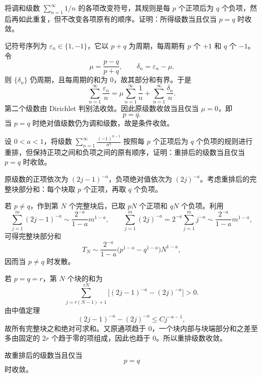 \begin{xexercise}[2]
将调和级数 $\sum_{n=1}^{\infty}1/n$ 的各项改变符号，其规则是每 $p$ 个正项后为 $q$ 个负项，然后再如此重复，但不改变各项原有的顺序。证明：所得级数当且仅当 $p=q$ 时收敛。
\end{xexercise}
\begin{xsolution}
记符号序列为 $\varepsilon_n\in\{1,-1\}$，它以 $p+q$ 为周期，每周期有 $p$ 个 $+1$ 和 $q$ 个 $-1$。令
\[
 \mu=\frac{p-q}{p+q},\qquad \delta_n=\varepsilon_n-\mu.
\]
则 $\{\delta_n\}$ 仍周期，且每周期的和为 $0$，故其部分和有界。于是
\[
 \sum_{n=1}^{\infty}\frac{\varepsilon_n}{n}
 =\mu\sum_{n=1}^{\infty}\frac1n
 +\sum_{n=1}^{\infty}\frac{\delta_n}{n}.
\]
第二个级数由 Dirichlet 判别法收敛。因此原级数收敛当且仅当 $\mu=0$，即
\[
 \boxed{p=q}.
\]
当 $p=q$ 时绝对值级数仍为调和级数，故是条件收敛。
\end{xsolution}


\begin{xexercise}[3]
设 $0<a<1$，将级数 $\sum_{n=1}^{\infty}\frac{(-1)^{n-1}}{n^a}$ 按照每 $p$ 个正项后为 $q$ 个负项的规则进行重排，但保持正项之间和负项之间的原有顺序，证明：重排后的级数当且仅当 $p=q$ 时收敛。
\end{xexercise}
\begin{xsolution}
原级数的正项依次为 $(2j-1)^{-a}$，负项绝对值依次为 $(2j)^{-a}$。考虑重排后的完整块部分和：每个块取 $p$ 个正项，再取 $q$ 个负项。

若 $p\neq q$，作到第 $N$ 个完整块后，已取 $pN$ 个正项和 $qN$ 个负项。利用
\[
 \sum_{j=1}^{m}(2j-1)^{-a}\sim\frac{2^{-a}}{1-a}m^{1-a},
 \qquad
 \sum_{j=1}^{m}(2j)^{-a}=2^{-a}\sum_{j=1}^{m}j^{-a}\sim\frac{2^{-a}}{1-a}m^{1-a},
\]
可得完整块部分和
\[
 T_N\sim\frac{2^{-a}}{1-a}\bigl(p^{1-a}-q^{1-a}\bigr)N^{1-a},
\]
因而当 $p\neq q$ 时发散。

若 $p=q=r$，第 $N$ 个块的和为
\[
 \sum_{j=r(N-1)+1}^{rN}\bigl[(2j-1)^{-a}-(2j)^{-a}\bigr]>0.
\]
由中值定理
\[
 (2j-1)^{-a}-(2j)^{-a}\leq Cj^{-a-1},
\]
故所有完整块之和绝对可求和。又原通项趋于 $0$，一个块内部与块端部分和之差至多由固定的 $2r$ 个趋于零的项组成，因此也趋于 $0$。所以重排级数收敛。

故重排后的级数当且仅当
\[
 \boxed{p=q}
\]
时收敛。
\end{xsolution}


